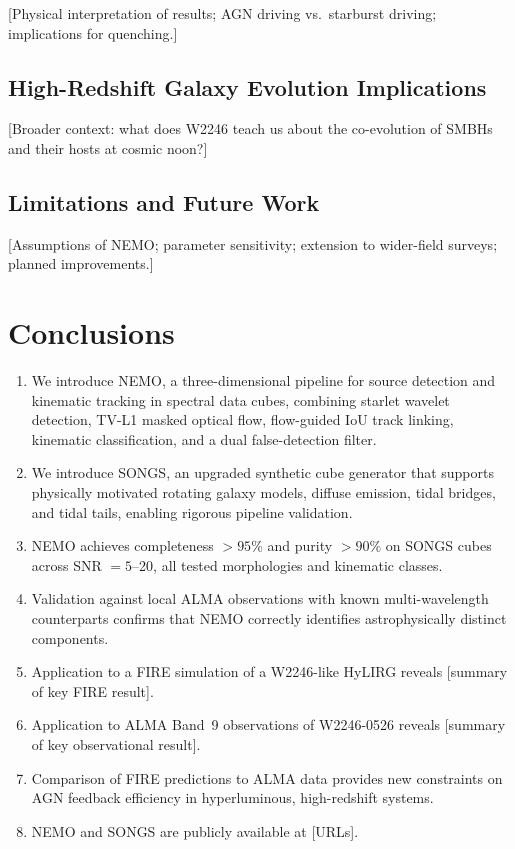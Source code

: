 \documentclass{aa}
\begin{document}
[Physical interpretation of results; AGN driving vs.\ starburst driving; implications for quenching.]

\subsection{High-Redshift Galaxy Evolution Implications}
\label{sec:discussion_evolution}

[Broader context: what does W2246 teach us about the co-evolution of SMBHs and their hosts at cosmic noon?]

\subsection{Limitations and Future Work}
\label{sec:discussion_limitations}

[Assumptions of NEMO; parameter sensitivity; extension to wider-field surveys; planned improvements.]

\section{Conclusions}
\label{sec:conclusions}

\begin{enumerate}
  \item We introduce NEMO, a three-dimensional pipeline for source detection and kinematic tracking in spectral data cubes, combining starlet wavelet detection, TV-L1 masked optical flow, flow-guided IoU track linking, kinematic classification, and a dual false-detection filter.
  \item We introduce SONGS, an upgraded synthetic cube generator that supports physically motivated rotating galaxy models, diffuse emission, tidal bridges, and tidal tails, enabling rigorous pipeline validation.
  \item NEMO achieves completeness $>95\%$ and purity $>90\%$ on SONGS cubes across SNR $= 5$--20, all tested morphologies and kinematic classes.
  \item Validation against local ALMA observations with known multi-wavelength counterparts confirms that NEMO correctly identifies astrophysically distinct components.
  \item Application to a FIRE simulation of a W2246-like HyLIRG reveals [summary of key FIRE result].
  \item Application to ALMA Band~9 observations of W2246-0526 reveals [summary of key observational result].
  \item Comparison of FIRE predictions to ALMA data provides new constraints on AGN feedback efficiency in hyperluminous, high-redshift systems.
  \item NEMO and SONGS are publicly available at [URLs].
\end{enumerate}
\end{document}
